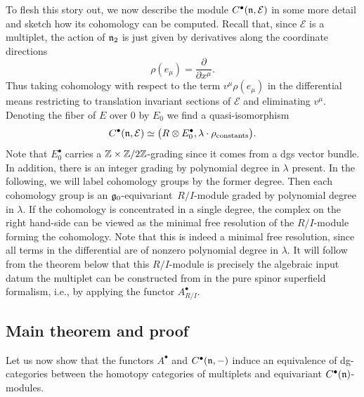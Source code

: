 \documentclass[11pt]{article}
\numberwithin{equation}{section}
\numberwithin{equation}{section}
\def\cE{\mathcal E}\def\cF{\mathcal F}\def\cG{\mathcal G}\def\cH{\mathcal H}
\begin{document}
To flesh this story out, we now describe the module $C^\bullet(\fn , \cE)$ in some more detail and sketch how its cohomology can be computed. Recall that, since $\cE$ is a multiplet, the action of $\mathfrak n_2$ is just given by derivatives along the coordinate directions
\begin{equation*}
\rho(e_\mu) = \frac{\partial}{\partial x^\mu} .
\end{equation*}
Thus taking cohomology with respect to the term $v^\mu \rho(e_\mu)$ in the differential means restricting to translation invariant sections of $\cE$ and eliminating $v^\mu$. Denoting the fiber of $E$ over 0 by $E_0$ we find a quasi-isomorphism
\begin{equation} \label{eq: compute C^bu}
C^\bullet(\fn ,\cE) \simeq \big( R \otimes E_0^\bullet , \lambda \cdot \rho_{\mathrm{constants}} \big) .
\end{equation}
Note that $E_0^\bullet$ carries a $\mathbb Z \times \mathbb Z/2\mathbb Z$-grading since it comes from a dgs vector bundle. In addition, there is an integer grading by polynomial degree in $\lambda$ present. In the following, we will label cohomology groups by the former degree. Then each cohomology group is an $\mathfrak g_0$-equivariant~$R/I$-module graded by polynomial degree in $\lambda$. If the cohomology is concentrated in a single degree, the complex on the right hand-side can be viewed as the minimal free resolution of the $R/I$-module forming the cohomology. Note that this is indeed a minimal free resolution, since all terms in the differential are of nonzero polynomial degree in $\lambda$. It will follow from the theorem below that this $R/I$-module is precisely the algebraic input datum the multiplet can be constructed from in the pure spinor superfield formalism, i.e., by applying the functor $A^\bullet_{R/I}$.


\subsection{Main theorem and proof}
Let us now show that the functors $A^\bullet$ and $C^\bullet(\mathfrak n,-)$ induce an equivalence of dg-categories between the homotopy categories of multiplets and equivariant $C^\bullet({\mathfrak n})$-modules.
\end{document}
